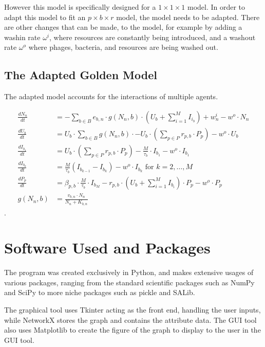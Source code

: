 However this model is specifically designed for a $1\times 1 \times 1$ model. 
In order to adapt this model to fit an $p \times b \times r$ model, the model needs to be adapted. 
There are other changes that can be made, to the model, for example by adding a washin rate $\omega^{i}$, where resources are constantly being introduced, and a washout rate $\omega^{o}$ where phages, bacteria, and resources are being washed out. 

\subsection{The Adapted Golden Model}
\label{sec:adapted_golden_model}
The adapted model accounts for the interactions of multiple agents. 

\begin{align}
    \frac{dN_n}{dt} &= -\sum_{b \in B} e_{b, n} \cdot g(N_n, b)\cdot (U_b + \sum_{i=1}^{M} I_{i_b}) + w^i_n - w^o \cdot N_n\\
    \frac{dU_b}{dt} &= U_b \cdot \sum_{b \in B} g(N_n, b)\cdot - U_b \cdot (\sum_{p \in P} r_{p, b} \cdot P_p) - w^o \cdot U_b\\
    \frac{dI_{b_1}}{dt} &= U_b \cdot (\sum_{p \in P}r_{p, b} \cdot P_p) - \frac{M}{\tau_b}\cdot I_{b_1} - w^o \cdot I_{b_1}\\
    \frac{dI_{b_k}}{dt} &= \frac{M}{\tau_b}(I_{b_{k-1}}-I_{b_k}) - w^o \cdot I_{b_k}\text{ for } k=2, \dots, M \\
    \frac{dP_p}{dt} &= \beta_{p, b}\cdot\frac{M}{\tau_b} \cdot I_{b_M} - r_{p, b}\cdot(U_b + \sum_{i=1}^{M} I_{b_i})\cdot P_p - w^o \cdot P_p\\
    g(N_n, b) &= \frac{v_{b, n} \cdot N_n}{N_n + K_{b, n}}
\end{align}. 


\section{Software Used and Packages}
The program was created exclusively in Python, and makes extensive usages of various packages, ranging from the standard scientific packages such as NumPy and SciPy to more niche packages such as pickle and SALib. \newline

The graphical tool uses Tkinter acting as the front end, handling the user inputs, while NetworkX stores the graph and contains the attribute data. 
The GUI tool also uses Matplotlib to create the figure of the graph to display to the user in the GUI tool. \newline

